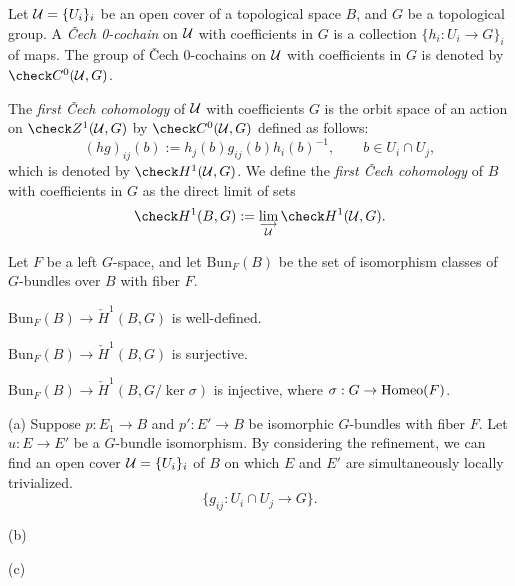\documentclass{../../large}
\begin{document}
\begin{prb}
Let $\mathcal{U}=\{U_i\}_i$ be an open cover of a topological space $B$, and $G$ be a topological group. 
A \emph{\v Cech 0-cochain} on $\mathcal{U}$ with coefficients in $G$ is a collection $\{h_i:U_i\to G\}_i$ of maps.
The group of \v Cech 0-cochains on $\mathcal{U}$ with coefficients in $G$ is denoted by $\check C^0(\cU,G)$.

The \emph{first \v Cech cohomology} of $\mathcal{U}$ with coefficients $G$ is the orbit space of an action on $\check Z^1(\cU,G)$ by $\check C^0(\cU,G)$ defined as follows:
\[(hg)_{ij}(b):=h_j(b)g_{ij}(b)h_i(b)^{-1},
\qquad b\in U_i\cap U_j,\]
which is denoted by $\check H^1(\cU,G)$.
We define the \emph{first \v Cech cohomology} of $B$ with coefficients in $G$ as the direct limit of sets
\[\check H^1(B,G):=\lim_{\substack{\longrightarrow\\\cU}}\check H^1(\cU,G).\]

Let $F$ be a left $G$-space, and let $\mathrm{Bun}_F(B)$ be the set of isomorphism classes of $G$-bundles over $B$ with fiber $F$.
\begin{parts}
\item $\mathrm{Bun}_F(B)\to\check H^1(B,G)$ is well-defined.
\item $\mathrm{Bun}_F(B)\to\check H^1(B,G)$ is surjective.
\item $\mathrm{Bun}_F(B)\to\check H^1(B,G/\ker\sigma)$ is injective, where $\sigma:G\to\operatorname{Homeo}(F)$.
\end{parts}
\end{prb}
\begin{pf}
(a)
Suppose $p:E_1\to B$ and $p':E'\to B$ be isomorphic $G$-bundles with fiber $F$.
Let $u:E\to E'$ be a $G$-bundle isomorphism.
By considering the refinement, we can find an open cover $\mathcal{U}=\{U_i\}_i$ of $B$ on which $E$ and $E'$ are simultaneously locally trivialized.
\[\{g_{ij}:U_i\cap U_j\to G\}.\]

(b)

(c)
\end{pf}
\end{document}

